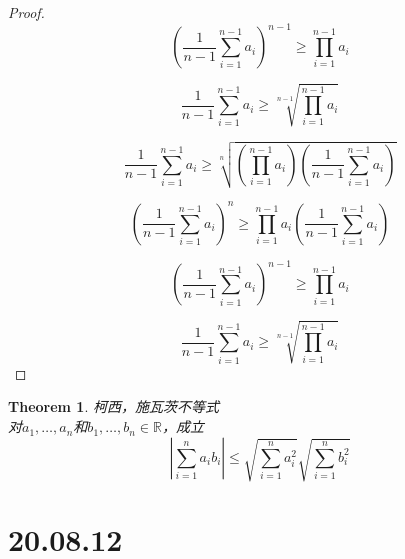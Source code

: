 \documentclass[10pt,a4paper]{book}
\newtheorem{theorem}{Theorem}[section]
\begin{document}
\begin{proof}
	\begin{equation}	
		(\frac{1}{n-1}\sum_{i=1}^{n-1}a_i)^{n-1}
		\geq \prod_{i=1}^{n-1}a_i
	\end{equation}


	\begin{equation}		
		\frac{1}{n-1}\sum_{i=1}^{n-1}a_i
		\geq \sqrt[n-1]{\prod_{i=1}^{n-1}a_i}
	\end{equation}


	\begin{equation}
		\frac{1}{n-1}\sum_{i=1}^{n-1}a_i \geq \sqrt[n]{(\prod_{i=1}^{n-1}a_i)(\frac{1}{n-1}\sum_{i=1}^{n-1}a_i)}
	\end{equation}
	
	\begin{equation}
		( \frac{1}{n-1}\sum_{i=1}^{n-1}a_i )^n \geq \prod_{i=1}^{n-1}a_i(\frac{1}{n-1}\sum_{i=1}^{n-1}a_i)
	\end{equation}

	\begin{equation}
		( \frac{1}{n-1}\sum_{i=1}^{n-1}a_i )^{n-1} \geq \prod_{i=1}^{n-1}a_i
	\end{equation}
	
	\begin{equation}
		 \frac{1}{n-1}\sum_{i=1}^{n-1}a_i  \geq \sqrt[n-1]{\prod_{i=1}^{n-1}a_i}
	\end{equation}
	
	\end{proof}
	
	\begin{theorem}
		柯西，施瓦茨不等式\\	
		对$ a_1,\dots,a_n $和$ b_1, \dots ,b_n \in \mathbb{R}$，成立
		\begin{equation}
			|\sum_{i=1}^n a_ib_i|\leq \sqrt{\sum_{i=1}^n a_i^2}\sqrt{\sum_{i=1}^n b_i^2}
		\end{equation}
		\label{1.3.5}
	\end{theorem}
	


	\section{20.08.12}
	
\end{document}

